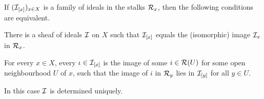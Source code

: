 \documentclass[a4paper,parskip=half,numbers=enddot, DIV=12]{scrreprt}
\begin{document}
\begin{prop}
    If $(\mathcal{I}_{[x]})_{x\in X}$ is a family of ideals in the stalks $\mathcal{R}_x$, then the following conditions are equivalent.
    \begin{alphanumerate}
        \item 
            There is a sheaf of ideals $\mathcal{I}$ on $X$ such that $\mathcal{I}_{[x]}$ equals the (isomorphic) image $\mathcal{I}_x$ in $\mathcal{R}_x$.
        \item  
            For every $x\in X$, every $\iota\in \mathcal{I}_{[x]}$ is the image of some $i\in\mathcal{R}(U)$ for some open neighbourhood $U$ of $x$, such that the image of $i$ in $\mathcal{R}_y$ lies in $\mathcal{I}_{[y]}$ for all $y\in U$.
    \end{alphanumerate}
    In this case $\mathcal{I}$ is determined uniquely.
\end{prop}
\newpage
\newlength{\currentparskip}
\setlength{\currentparskip}{\parskip}
\end{document}
